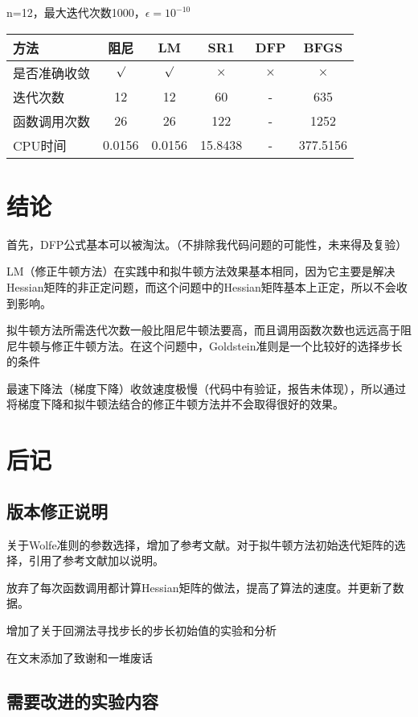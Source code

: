 \documentclass[11pt, a4paper]{article}
\begin{document}
\vspace{20pt}
n=12，最大迭代次数1000，$\epsilon=10^{-10}$

\vspace{10pt}
\begin{tabular}{|l|c|c|c|c|c|}
	\hline
	方法 & 阻尼 & LM & SR1 & DFP & BFGS \\\hline
	是否准确收敛 & $\surd$ & $\surd$ & $\times$ & $\times$ & $\times$ \\\hline
	迭代次数 & 12 & 12 & 60 & - & 635 \\\hline
	函数调用次数 & 26 & 26 & 122 & - & 1252 \\\hline
	CPU时间 & 0.0156 & 0.0156 & 15.8438 & - & 377.5156\\\hline
\end{tabular}

\section{结论}

首先，DFP公式基本可以被淘汰。（不排除我代码问题的可能性，未来得及复验）

LM（修正牛顿方法）在实践中和拟牛顿方法效果基本相同，因为它主要是解决Hessian矩阵的非正定问题，而这个问题中的Hessian矩阵基本上正定，所以不会收到影响。

拟牛顿方法所需迭代次数一般比阻尼牛顿法要高，而且调用函数次数也远远高于阻尼牛顿与修正牛顿方法。在这个问题中，Goldstein准则是一个比较好的选择步长的条件

最速下降法（梯度下降）收敛速度极慢（代码中有验证，报告未体现），所以通过将梯度下降和拟牛顿法结合的修正牛顿方法并不会取得很好的效果。

\section{后记}
\subsection{版本修正说明}
关于Wolfe准则的参数选择，增加了参考文献。对于拟牛顿方法初始迭代矩阵的选择，引用了参考文献加以说明。

放弃了每次函数调用都计算Hessian矩阵的做法，提高了算法的速度。并更新了数据。

增加了关于回溯法寻找步长的步长初始值的实验和分析

在文末添加了致谢和一堆废话

\subsection{需要改进的实验内容}
\end{document}
